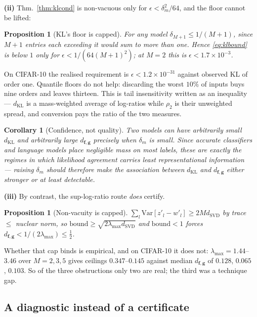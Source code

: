 \documentclass[10pt,letterpaper,twocolumn]{article}
\newcommand{\bff}{\mathbf{f}}
\newcommand{\bfg}{\mathbf{g}}
\newcommand{\dKL}{d_{\mathrm{KL}}}
\newcommand{\dSVD}{d_{\mathrm{SVD}}}
\newcommand{\dfg}{d_{\bff,\bfg}}
\newcommand{\Var}{\mathrm{Var}}
\theoremstyle{plain}
\newtheorem{proposition}[theorem]{Proposition}
\newtheorem{corollary}[theorem]{Corollary}
\theoremstyle{definition}
\theoremstyle{remark}
\begin{document}
\textbf{(ii)} Thm.~\ref{thm:klcond} is non-vacuous only for
$\epsilon<\delta_{m}^{2}/64$, and the floor cannot be lifted:
\begin{proposition}[KL's floor is capped]
\label{prop:floorcap}
For any model $\delta_{M+1}\le1/(M+1)$, since $M+1$ entries each exceeding it
would sum to more than one. Hence \eqref{eq:klbound} is below $1$ only for
$\epsilon<1/(64(M+1)^{2})$; at $M=2$ this is $\epsilon<1.7\times10^{-3}$.
\end{proposition}
On CIFAR-10 the realised requirement is
$\epsilon<1.2\times10^{-31}$ against observed KL of order one. Quantile floors do not help: discarding the worst
$10\%$ of inputs buys nine orders and leaves thirteen. This is tail
insensitivity written as an inequality --- $\dKL$ is a mass-weighted average of
log-ratios while $\rho_{2}$ is their unweighted spread, and conversion pays the
ratio of the two measures.

\begin{corollary}[Confidence, not quality]
\label{cor:conf}
Two models can have arbitrarily small $\dKL$ and arbitrarily large $\dfg$
precisely when $\delta_{m}$ is small. Since accurate classifiers and language
models place negligible mass on most labels, these are exactly the regimes in
which likelihood agreement carries least representational information ---
raising $\delta_{m}$ should therefore make the association between $\dKL$ and
$\dfg$ either stronger or at least detectable.
\end{corollary}

\textbf{(iii)} By contrast, the sup-log-ratio route \emph{does} certify.
\begin{proposition}[Non-vacuity is capped]
\label{prop:ceiling}
$\sum_{l}\Var[z'_{l}-w'_{l}]\ge2M\dSVD$ by trace $\le$ nuclear norm, so
$\mathrm{bound}\ge\sqrt{2\lambda_{\max}\dSVD}$ and $\mathrm{bound}<1$ forces
$\dfg<1/(2\lambda_{\max})\le\frac12$.
\end{proposition}
Whether that cap binds is empirical, and on CIFAR-10 it does not:
$\lambda_{\max}=1.44$--$3.46$ over $M=2,3,5$ gives ceilings $0.347$--$0.145$
against median $\dfg$ of $0.128$, $0.065$, $0.103$. So of the three
obstructions only two are real; the third was a technique gap.

\subsection{A diagnostic instead of a certificate}
\label{sec:diagnostic}
\end{document}

